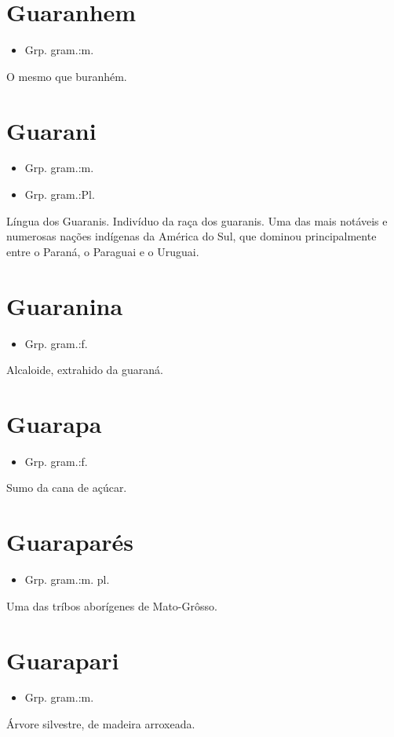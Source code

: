 \section{Guaranhem}
\begin{itemize}
\item {Grp. gram.:m.}
\end{itemize}
O mesmo que \textunderscore buranhém\textunderscore .
\section{Guarani}
\begin{itemize}
\item {Grp. gram.:m.}
\end{itemize}
\begin{itemize}
\item {Grp. gram.:Pl.}
\end{itemize}
Língua dos Guaranis.
Indivíduo da raça dos guaranis.
Uma das mais notáveis e numerosas nações indígenas da América do Sul, que dominou principalmente entre o Paraná, o Paraguai e o Uruguai.
\section{Guaranina}
\begin{itemize}
\item {Grp. gram.:f.}
\end{itemize}
Alcaloide, extrahido da guaraná.
\section{Guarapa}
\begin{itemize}
\item {Grp. gram.:f.}
\end{itemize}
Sumo da cana de açúcar.
\section{Guaraparés}
\begin{itemize}
\item {Grp. gram.:m. pl.}
\end{itemize}
Uma das tríbos aborígenes de Mato-Grôsso.
\section{Guarapari}
\begin{itemize}
\item {Grp. gram.:m.}
\end{itemize}
Árvore silvestre, de madeira arroxeada.

